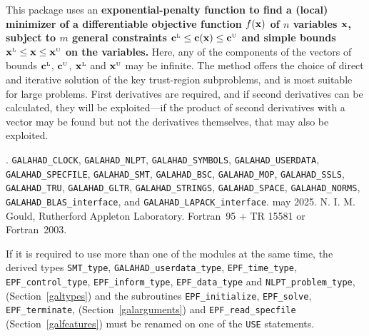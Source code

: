 \documentclass{galahad}
\newcommand{\packagename}{EPF}
\newcommand{\fullpackagename}{\libraryname\_\packagename}
\newcommand{\sL}{\s{L}}
\newcommand{\sU}{\s{U}}
\begin{document}
\galheader


\galsummary
This package uses an {\bf exponential-penalty function to find a (local)
minimizer of a differentiable objective function $f({\mathbf{x}})$
of $n$ variables ${\mathbf{x}}$, subject 
to $m$ general constraints $\bmc\sL \leq \bmc(\bmx) \leq \bmc\sU$
and simple bounds $\bmx\sL \leq \bmx \leq \bmx\sU$ on the variables.}
Here, any of the components of the vectors of bounds 
$\bmc\sL$, $\bmc\sU$, $\bmx\sL$ and $\bmx\sU$ may be infinite. 
The method offers the choice of direct
and iterative solution of the key trust-region subproblems, and
is most suitable for large problems. First derivatives are required,
and if second derivatives can be calculated, they will be exploited---if
the product of second derivatives with a vector may be found but
not the derivatives themselves, that may also be exploited.


\galattributes
\galversions{\tt  \fullpackagename\_single, \fullpackagename\_double}.
\galuses
{\tt GALAHAD\_CLOCK},
{\tt GALAHAD\_NLPT},
{\tt GALAHAD\_SY\-M\-BOLS},
{\tt GALAHAD\_USERDATA},
{\tt GALAHAD\_SPECFILE},
{\tt GALAHAD\_SMT},
{\tt GALAHAD\_BSC},
{\tt GALAHAD\_MOP},
{\tt GALAHAD\_\-SSLS},
{\tt GALAHAD\_TRU},
{\tt GALAHAD\_GLTR},
{\tt GALAHAD\_STRINGS},
{\tt GALAHAD\_SPACE},
{\tt GALAHAD\_\-NORMS},
{\tt GALAHAD\_BLAS\_interface},
and
{\tt GALAHAD\_LAPACK\_interface}.
\galdate may 2025.
\galorigin N. I. M. Gould, Rutherford Appleton Laboratory.
\gallanguage Fortran~95 + TR 15581 or Fortran~2003.


\galhowto



\noindent
If it is required to use more than one of the modules at the same time, 
the derived types
{\tt SMT\_type},
{\tt GALAHAD\_userdata\_\-type},
{\tt \packagename\_time\_\-type},
{\tt \packagename\_control\_type},
{\tt \packagename\_inform\_type},
{\tt \packagename\_data\_type}
and
{\tt NLPT\_problem\_type},
(Section~\ref{galtypes})
and the subroutines
{\tt \packagename\_initialize},
{\tt \packagename\_\-solve},
{\tt \packagename\_terminate},
(Section~\ref{galarguments})
and
{\tt \packagename\_read\_specfile}
(Section~\ref{galfeatures})
must be renamed on one of the {\tt USE} statements.

\end{document}
